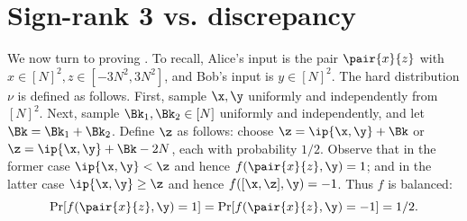 %
%
%
%
%
%


\section{Sign-rank 3 vs. discrepancy}\label{sec:signrank3}

We now turn to %
proving  %
. To recall, Alice's input is the pair $\pair{x}{z}$ with $x \in [N]^2, z \in [-3N^2, 3N^2]$, and Bob's input is $y \in [N]^2$.
The hard distribution $\nu$ is defined as follows. First, sample $\x,\y$ uniformly and independently from $[N]^2$. Next, sample $\Bk_1,\Bk_2 \in [N]$ uniformly and independently, and let $\Bk = \Bk_1 + \Bk_2$. Define $\z$ as follows: choose $\z=\ip{\x,\y} +\Bk$ or $\z=\ip{\x,\y} +\Bk-2N$, each with probability $1/2$. Observe that in the former case $\ip{\x,\y} < \z$ and hence $f(\pair{x}{z},\y)=1$;
and in the latter case $\ip{\x,\y} \ge \z$ and hence $f([\x,\z],\y)=-1$. Thus $f$ is balanced:
$$
\Pr[f(\pair{x}{z},\y)=1] = \Pr[f(\pair{x}{z},\y)=-1] = 1/2.
$$

%

